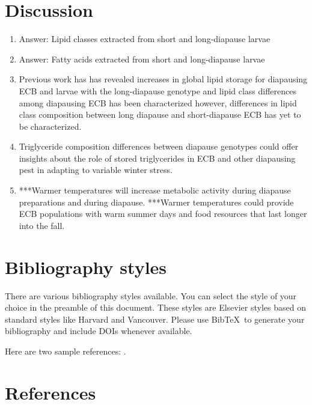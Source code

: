 \documentclass[review]{elsarticle}
\begin{document}
\section{Discussion}
\begin{enumerate}
    \item Answer: Lipid classes extracted from short and long-diapause larvae
    \item Answer: Fatty acids extracted from short and long-diapause larvae
    \item Previous work has has revealed increases in global lipid storage for diapausing ECB and larvae with the long-diapause genotype and lipid class differences among diapausing ECB has been characterized however, differences in lipid class composition between long diapause and short-diapause ECB has yet to be characterized.
    \item Triglyceride composition differences between diapause genotypes could offer insights about the role of stored triglycerides in ECB and other diapausing pest in adapting to variable winter stress.
    \item ***Warmer temperatures will increase metabolic activity during diapause preparations and during diapause. ***Warmer temperatures could provide ECB populations with warm summer days and food resources that last longer into the fall.
\end{enumerate}
\section{Bibliography styles}

There are various bibliography styles available. You can select the style of your choice in the preamble of this document. These styles are Elsevier styles based on standard styles like Harvard and Vancouver. Please use Bib\TeX\ to generate your bibliography and include DOIs whenever available.

Here are two sample references: \cite{Feynman1963118,Dirac1953888}.

\section*{References}


\end{document}
